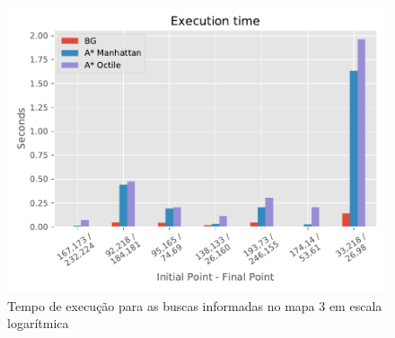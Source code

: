 \begin{figure}[!htb]
\begin{minipage}{0.5\linewidth}
\centering
\includegraphics[width=\textwidth]{Images/Execution_time_map3_log_heuristic.pdf}
\caption{Tempo de execução para as buscas informadas no mapa 3 em escala logarítmica}
\label{fig:time3-heur}
\end{minipage}
\end{figure}